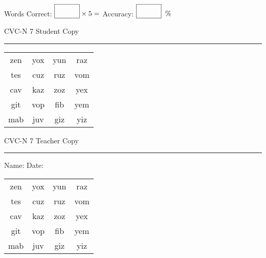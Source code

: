 \documentclass{memoir}
\begin{document}
\small

Words Correct: $\fbox{\phantom{\huge 100}} \times 5 = $ Accuracy: $\fbox{\phantom{\huge 100}}\;\; \%$ 

\vfill

\newpage


\footnotesize \noindent
CVC-N 7 \hfill Student Copy
\smallskip
\hrule

\Large

\setlength{\tabcolsep}{14pt}
\def\arraystretch{2}

{\selectfont


\begin{vplace}[0.5]
\begin{center}
\begin{tabular}{cccc}
zen & yox & yun & raz \\
tes & cuz & ruz & vom \\
cav & kaz & zoz & yex \\
git & vop & fib & yem \\
mab & juv & giz & yiz \\
\end{tabular}
\end{center}
\end{vplace}

}

\newpage

\footnotesize \noindent
CVC-N 7 \hfill Teacher Copy
\smallskip
\hrule

\small

\vfill

\noindent
Name: \underline{\hspace{1.75in}} \hfill Date: \underline{\hspace{1in}}

\Large

{\selectfont


\begin{vplace}[0.5]
\begin{center}
\begin{tabular}{cccc}
zen & yox & yun & raz \\
tes & cuz & ruz & vom \\
cav & kaz & zoz & yex \\
git & vop & fib & yem \\
mab & juv & giz & yiz \\
\end{tabular}
\end{center}
\end{vplace}



}
\end{document}
